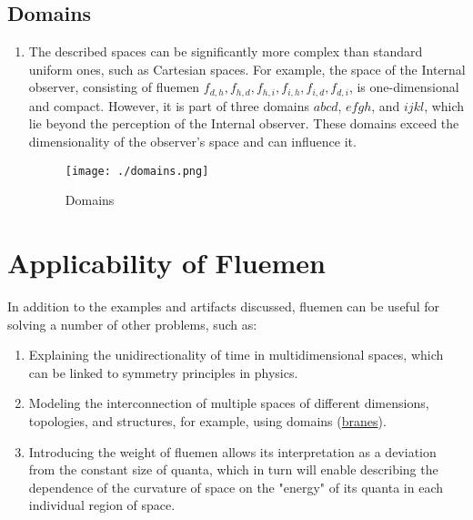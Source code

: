 \documentclass[final]{article}
\begin{document}
        \subsection{Domains}

            \begin{enumerate}

                \item The described spaces can be significantly more complex 
                than standard uniform ones, such as Cartesian spaces. For 
                example, the space of the Internal observer, consisting of 
                fluemen \(f_{d,h}, f_{h,d}, f_{h,i}, f_{i,h}, f_{i,d}, 
                f_{d,i}\), is one-dimensional and compact. However, it is part 
                of three domains \(abcd\), \(efgh\), and \(ijkl\), which lie 
                beyond the perception of the Internal observer. These domains 
                exceed the dimensionality of the observer's space and can 
                influence it.

                \begin{figure}[H]
                    \centering
                    \texttt{[image: ./domains.png]}
                    \caption{Domains}
                    \label{fig:image}
                \end{figure}

            \end{enumerate}



    \section{Applicability of Fluemen}

        In addition to the examples and artifacts discussed, fluemen can be 
        useful for solving a number of other problems, such as:

        \begin{enumerate}

            \item Explaining the unidirectionality of time in multidimensional 
            spaces, which can be linked to symmetry principles in physics.

            \item Modeling the interconnection of multiple spaces of different 
            dimensions, topologies, and structures, for example, using domains 
            (\href{https://en.wikipedia.org/wiki/Brane}{branes}).

            \item Introducing the weight of fluemen allows its interpretation as 
            a deviation from the constant size of quanta, which in turn will 
            enable describing the dependence of the curvature of space on the 
            "energy" of its quanta in each individual region of space.

        \end{enumerate}
\end{document}
